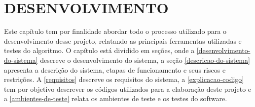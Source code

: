 \chapter{\textbf{DESENVOLVIMENTO}}
\label{desenvolvimento}

Este capítulo tem por finalidade abordar todo o processo utilizado para o desenvolvimento desse projeto, relatando as principais ferramentas utilizadas e testes do algoritmo. O capítulo está dividido em seções, onde a \autoref{desenvolvimento-do-sistema} descreve o desenvolvimento do sistema, a seção \autoref{descricao-do-sistema} apresenta a descrição do sistema, etapas de funcionamento e seus riscos e restrições. A \autoref{requisitos} descreve os requisitos do sistema, a \autoref{explicacao-codigo} tem por objetivo descrever os códigos utilizados para a elaboração deste projeto e a \autoref{ambientes-de-teste} relata os ambientes de teste e os testes do software.















